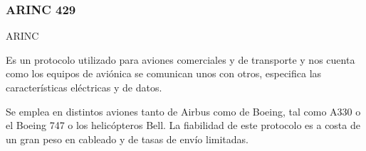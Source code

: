 


\subsubsection{ARINC 429}
\label{sec:01.05.01.ARINC.429}

\ac{ARINC}

Es un protocolo utilizado para aviones comerciales y de transporte
y nos cuenta como los equipos de aviónica se comunican unos con otros,
especifica las características eléctricas y de datos.

Se emplea en distintos aviones tanto de Airbus como de Boeing, tal
como A330 o el Boeing 747 o los helicópteros Bell. La fiabilidad de este
protocolo es a costa de un gran peso en cableado y de tasas de envío
limitadas.





